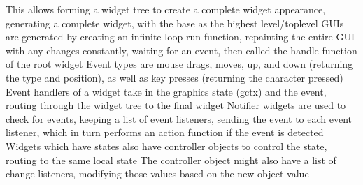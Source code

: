 \documentclass[11 pt, twoside]{article}
\newenvironment{outline*}
{
	\begin{outline}[enumerate]
	}
	{\end{outline}
}
\begin{document}
\begin{outline*}
	 	\3 This allows forming a widget tree to create a complete widget appearance, generating a complete widget, with the base as the highest level/toplevel
\1 GUIs are generated by creating an infinite loop run function, repainting the entire GUI with any changes constantly, waiting for an event, then called the handle function of the root widget
	\2 Event types are mouse drags, moves, up, and down (returning the type and position), as well as key presses (returning the character pressed)
	\2 Event handlers of a widget take in the graphics state (gctx) and the event, routing through the widget tree to the final widget
		\3 Notifier widgets are used to check for events, keeping a list of event listeners, sending the event to each event listener, which in turn performs an action function if the event is detected
	\2 Widgets which have states also have controller objects to control the state, routing to the same local state
		\3 The controller object might also have a list of change listeners, modifying those values based on the new object value
\end{outline*}
\end{document}
